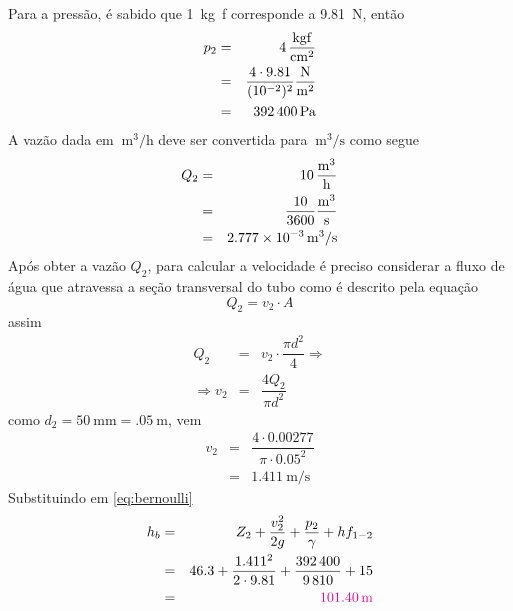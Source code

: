 \documentclass[a4paper, 12pt, brazilian]{article}
\newcommand{\purple}[1]{\textcolor{magenta}{#1}}
\begin{document}
	Para a pressão, é sabido que \SI{1}{\kilogram f} corresponde a \SI{9.81}{\newton}, então
	\begin{eqnarray}
		p_{2}&=&\SI{4}{\dfrac{\kilogram f}{\centi\meter^{2}}}\\
			 &=&\dfrac{4\cdot 9.81}{(10^{-2})^{2}}\SI{}{\dfrac{\newton}{\meter^{2}}}\\
			 &=&\SI{392400}{\pascal}
	\end{eqnarray}
	A vazão dada em $\SI{}{\meter^{3}/\hour}$ deve ser convertida para $\SI{}{\meter^{3}/\second}$ como segue
	\begin{eqnarray}
		Q_{2}&=&\SI{10}{\dfrac{\meter^{3}}{\hour}}\\
			 &=&\dfrac{10}{3600}\SI{}{\dfrac{\meter^{3}}{\second}}\\
			 &=&\SI{2.777e-3}{\meter^{3}/\second}
	\end{eqnarray}
	Após obter a vazão $Q_{2}$, para calcular a velocidade é preciso considerar a fluxo de água que atravessa a seção transversal do tubo como é descrito pela equação
	\begin{equation}
		Q_{2}=v_{2}\cdot A
	\end{equation}
	assim
	\begin{eqnarray}
		Q_{2}&=&v_{2}\cdot\dfrac{\pi d^{2}}{4}\Rightarrow\\
		\Rightarrow	v_{2}&=&\dfrac{4Q_{2}}{\pi d^{2}}
	\end{eqnarray}
	como $d_{2}=\SI{50}{\milli\meter}=\SI{.05}{\meter}$, vem
	\begin{eqnarray}
		v_{2}&=&\dfrac{4\cdot 0.00277}{\pi\cdot 0.05^{2}}\\
			 &=&\SI{1.411}{\meter/\second}
	\end{eqnarray}
	Substituindo em \eqref{eq:bernoulli}
	\begin{eqnarray}
		h_{b}&=&Z_{2}+\dfrac{v_{2}^{2}}{2g}+\dfrac{p_{2}}{\gamma}+hf_{1-2}\\
			 &=&46.3+\dfrac{1.411^{2}}{2\cdot 9.81}+\dfrac{392\,400}{9\,810}+15\\
			 &=&\purple{\SI{101.40}{\meter}}
	\end{eqnarray}
\end{document}
